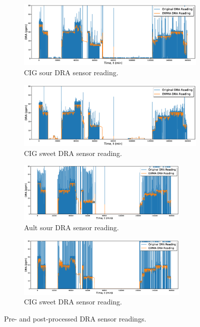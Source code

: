 \begin{figure}[ht]
     \centering
     \begin{subfigure}[b]{0.9\textwidth}
         \centering
         \includegraphics[width=\textwidth]{images/08CIGSour.eps}
         \caption{CIG sour DRA sensor reading.}
         \label{fig:08CIGSour}
     \end{subfigure}
     \hfill
     \begin{subfigure}[b]{0.9\textwidth}
         \centering
         \includegraphics[width=\textwidth]{images/08CIGSweet.eps}
         \caption{CIG sweet DRA sensor reading.}
         \label{fig:08CIGSweet}
     \end{subfigure}
          \begin{subfigure}[b]{1\textwidth}
         \centering
         \includegraphics[width=0.9\textwidth]{images/08AultSour.eps}
         \caption{Ault sour DRA sensor reading.}
         \label{fig:08AultSour}
     \end{subfigure}
     \hfill
     \begin{subfigure}[b]{1\textwidth}
         \centering
         \includegraphics[width=0.9\textwidth]{images/08AultSweet.eps}
         \caption{CIG sweet DRA sensor reading.}
         \label{fig:08AultSweet}
     \end{subfigure}
        \caption{Pre- and post-processed DRA sensor readings.}
        \label{fig:08DRA}
\end{figure}

